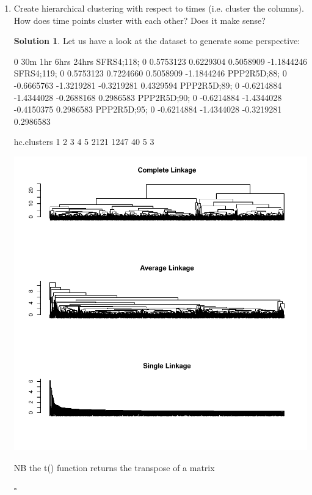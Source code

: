 \documentclass[twoside]{article}
\theoremstyle{definition}
\newtheorem*{solutionT}{Solution}
\newenvironment{solution}{\begin{cBox}\begin{solutionT}}{\hfill{\scriptsize\ensuremath{\square}}\end{solutionT}\end{cBox}}
\theoremstyle{definition}
\begin{document}
\begin{enumerate}
\item Create hierarchical clustering with respect to times (i.e. cluster the columns). How
does time points cluster with each other? Does it make sense?
\begin{solution}
Let us have a look at the dataset to generate some perspective:
\begin{Schunk}
\begin{Soutput}
            0        30m        1hr       6hrs      24hrs
SFRS4;118;  0  0.5753123  0.6229304  0.5058909 -1.1844246
SFRS4;119;  0  0.5753123  0.7224660  0.5058909 -1.1844246
PPP2R5D;88; 0 -0.6665763 -1.3219281 -0.3219281  0.4329594
PPP2R5D;89; 0 -0.6214884 -1.4344028 -0.2688168  0.2986583
PPP2R5D;90; 0 -0.6214884 -1.4344028 -0.4150375  0.2986583
PPP2R5D;95; 0 -0.6214884 -1.4344028 -0.3219281  0.2986583
\end{Soutput}
\begin{Soutput}
hc.clusters
   1    2    3    4    5 
2121 1247   40    5    3 
\end{Soutput}
\end{Schunk}
\includegraphics{w2-004}
\begin{cBox}
NB the t() function returns the transpose of a matrix
\end{cBox}
\end{solution}


\end{enumerate}
\end{document}
